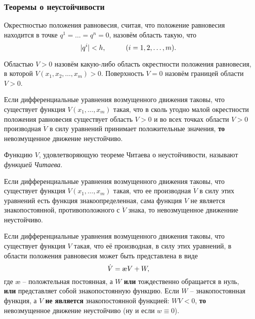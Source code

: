 \subsubsection*{Теоремы о неустойчивости}

\begin{to_def}
    Окрестностью положения равновесия, считая, что положение равновесия находится в точке $q^1=\ldots=q^n=0$, назовём область такую, что
    \begin{equation*}
        |q^i| < h, \hspace{1 cm} (i=1, 2,\ldots,m).
    \end{equation*}
\end{to_def}

\begin{to_def}
    Областью $V > 0$ назовём какую-либо область окрестности положения равновесия, в которой $V(x_1, x_2, \ldots, x_m) > 0$. Поверхность $V = 0$ назовём границей области $V >0$.
\end{to_def}

\begin{to_thr}
    Если дифференциальные уравнения возмущенного движения таковы, что существует функция $V(x_1, \ldots, x_m)$ такая, что в сколь угодно малой окрестности положения равновесия существует область $V > 0$ и во всех точках области $V > 0$ производная $\dot{V}$ в силу уравнений принимает положительные значения, \textbf{то} невозмущенное движение неустойчиво.
\end{to_thr}

\begin{to_def}
    Функцию $V$, удовлетворяющую теореме Читаева о неустойчивости, называют \textit{функцией} \textit{Читаева}.
\end{to_def}



\begin{to_thr}
    Если дифференциальные уравнения возмущенного движения таковы, что существует функция $V(x_1, \ldots, x_m)$ такая, что ее производная $\dot{V}$ в силу этих уравнений есть функция знакоопределенная, сама функция $V$ не является знакопостоянной, противоположного с $\dot{V}$ знака, то невозмущенное движенние неустойчиво.
\end{to_thr}

\begin{to_thr}
    Если дифференциальные уравнения возмущенного движения таковы, что существует функция $V$ такая, что её производная, в силу этих уравнений, в области положения равновесия может быть представлена в виде
    \begin{equation*}
        \dot{V} = \textnormal{\ae} V + W,
    \end{equation*}
    где \textnormal{\ae} -- положтельная постоянная, а $W$ \textbf{или} тождественно обращается в нуль, \textbf{или} представляет собой знакопостоянную функцию. Если $W$ -- знакопостоянная функция, а $V$ \textbf{не является}  знакопостоянной функцией: $W V < 0$, \textbf{то} невозмущенное движение неустойчиво (ну и если $w \equiv 0$).
\end{to_thr}